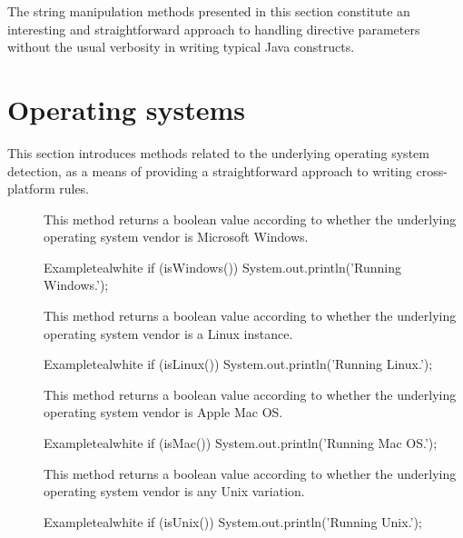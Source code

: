 The string manipulation methods presented in this section constitute an interesting and straightforward approach to handling directive parameters without the usual verbosity in writing typical Java constructs.

\section{Operating systems}
\label{sec:operatingsystems}

This section introduces methods related to the underlying operating system detection, as a means of providing a straightforward approach to writing cross-platform rules.

\begin{description}
\item[] This method returns a boolean value according to whether the underlying operating system vendor is Microsoft Windows.

\begin{codebox}{Example}{teal}{\icnote}{white}
if (isWindows()) { System.out.println('Running Windows.'); }
\end{codebox}

\item[] This method returns a boolean value according to whether the underlying operating system vendor is a Linux instance.

\begin{codebox}{Example}{teal}{\icnote}{white}
if (isLinux()) { System.out.println('Running Linux.'); }
\end{codebox}

\item[] This method returns a boolean value according to whether the underlying operating system vendor is Apple Mac OS.

\begin{codebox}{Example}{teal}{\icnote}{white}
if (isMac()) { System.out.println('Running Mac OS.'); }
\end{codebox}

\item[] This method returns a boolean value according to whether the underlying operating system vendor is any Unix variation.

\begin{codebox}{Example}{teal}{\icnote}{white}
if (isUnix()) { System.out.println('Running Unix.'); }
\end{codebox}


\end{description}
